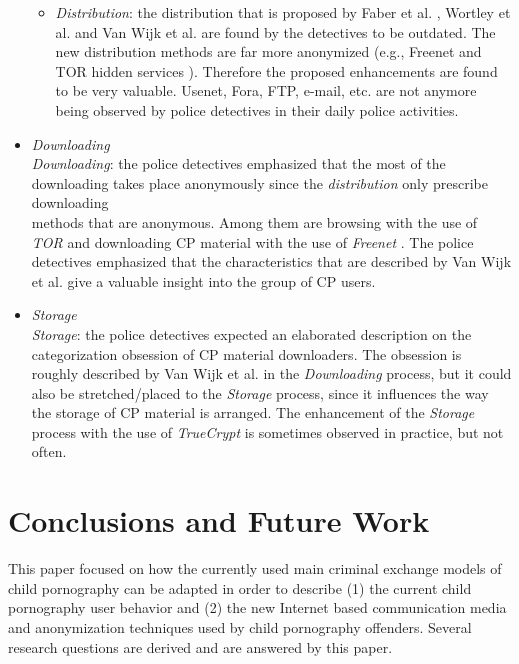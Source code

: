\documentclass{sig-alternate-br}
\begin{document}
\begin{itemize}
\begin{itemize}
			\item \textit{Distribution}: the distribution that is proposed by Faber et al. \cite{en2011phishing}, Wortley et al. \cite{wortley2006child} and Van Wijk et al. \cite{wijk2009achter} are found by the detectives to be outdated. The new distribution methods are far more anonymized (e.g., Freenet \cite{clarke2001freenet} and TOR hidden services \cite{dingledine2004tor}). Therefore the proposed enhancements are found to be very valuable. Usenet, Fora, FTP, e-mail, etc. are not anymore being observed by police detectives in their daily police activities.
		\end{itemize}
	\item \textit{Downloading}\\
		\textit{Downloading}: the police detectives emphasized that the most of the downloading takes place anonymously since the \textit{distribution} only prescribe downloading\\ methods that are anonymous. Among them are browsing with the use of \textit{TOR} \cite{dingledine2004tor} and downloading CP material with the use of \textit{Freenet} \cite{clarke2001freenet}. The police detectives emphasized that the characteristics that are described by Van Wijk et al. \cite{wijk2009achter} give a valuable insight into the group of CP users.
	\item \textit{Storage}\\
		\textit{Storage}: the police detectives expected an elaborated description on the categorization obsession of CP material downloaders. The obsession is roughly described by Van Wijk et al. \cite{wijk2009achter} in the \textit{Downloading} process, but it could also be stretched/placed to the \textit{Storage} process, since it influences the way the storage of CP material is arranged. The enhancement of the \textit{Storage} process with the use of \textit{TrueCrypt} is sometimes observed in practice, but not often.
\end{itemize}


\section{Conclusions and Future Work}
This paper focused on how the currently used main criminal exchange models of child pornography can be adapted in order to describe (1) the current child pornography user behavior and (2) the new Internet based communication media and anonymization techniques used by child pornography offenders. Several research questions are derived and are answered by this paper.
\end{document}
